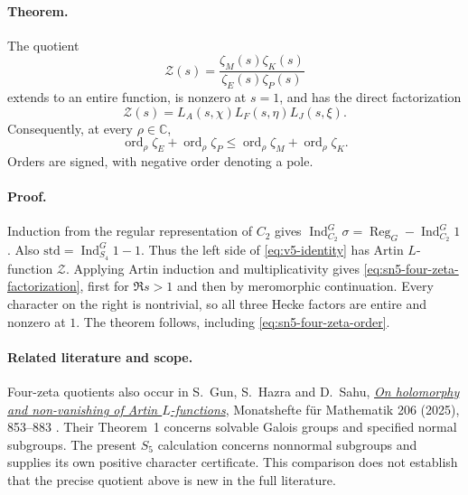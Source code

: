 \paragraph{Theorem.}
The quotient
\begin{equation}
 \mathcal Z(s)=\frac{\zeta_M(s)\zeta_K(s)}{\zeta_E(s)\zeta_P(s)}
\label{eq:sn5-four-zeta}
\end{equation}
extends to an entire function, is nonzero at $s=1$, and has the direct
factorization
\begin{equation}
 \mathcal Z(s)=L_A(s,\chi)L_F(s,\eta)L_J(s,\xi).
\label{eq:sn5-four-zeta-factorization}
\end{equation}
Consequently, at every $\rho\in\mathbb C$,
\begin{equation}
 \operatorname{ord}_{\rho}\zeta_E+
 \operatorname{ord}_{\rho}\zeta_P
 \leq \operatorname{ord}_{\rho}\zeta_M+
       \operatorname{ord}_{\rho}\zeta_K.
\label{eq:sn5-four-zeta-order}
\end{equation}
Orders are signed, with negative order denoting a pole.

\paragraph{Proof.}
Induction from the regular representation of $C_2$ gives
$\operatorname{Ind}_{C_2}^{G}\sigma
 =\operatorname{Reg}_{G}-\operatorname{Ind}_{C_2}^{G}1$.
Also $\mathrm{std}=\operatorname{Ind}_{S_4}^{G}1-1$.
Thus the left side of \eqref{eq:v5-identity} has Artin $L$-function
$\mathcal Z$. Applying Artin induction and multiplicativity gives
\eqref{eq:sn5-four-zeta-factorization}, first for $\Re s>1$ and then
by meromorphic continuation. Every character on the right is nontrivial,
so all three Hecke factors are entire and nonzero at $1$.
The theorem follows, including \eqref{eq:sn5-four-zeta-order}.

\paragraph{Related literature and scope.}
Four-zeta quotients also occur in S.~Gun, S.~Hazra and D.~Sahu,
\href{https://doi.org/10.1007/s00605-025-02060-7}{\emph{On holomorphy and
non-vanishing of Artin $L$-functions}}, Monatshefte f\"ur Mathematik
206 (2025), 853--883 \cite{gun}. Their Theorem~1 concerns solvable Galois groups
and specified normal subgroups. The present $S_5$ calculation concerns
nonnormal subgroups and supplies its own positive character certificate.
This comparison does not establish that the precise quotient above is
new in the full literature.

